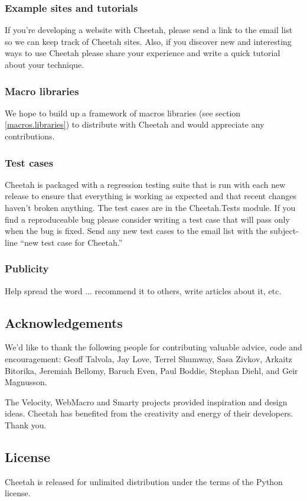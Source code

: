 \subsubsection{Example sites and tutorials}
If you're developing a website with Cheetah, please send a link to the
email list so we can keep track of Cheetah sites.  Also, if you discover
new and interesting ways to use Cheetah please share your experience and
write a quick tutorial about your technique.

\subsubsection{Macro libraries}
We hope to build up a framework of macros libraries (see section
\ref{macros.libraries}) to distribute with Cheetah and would appreciate
any contributions.

\subsubsection{Test cases}
Cheetah is packaged with a regression testing suite that is run with each
new release to ensure that everything is working as expected and that recent
changes haven't broken anything.  The test cases are in the Cheetah.Tests
module.  If you find a reproduceable bug please consider writing a test case
that will pass only when the bug is fixed.  Send any new test cases to the email
list with the subject-line ``new test case for Cheetah.''

\subsubsection{Publicity}
Help spread the word ... recommend it to others, write articles about it, etc.

\subsection{Acknowledgements}
\label{intro.acknowledgments}
    
We'd like to thank the following people for contributing valuable advice, code
and encouragement: Geoff Talvola, Jay Love, Terrel Shumway, Sasa Zivkov, Arkaitz
Bitorika, Jeremiah Bellomy, Baruch Even, Paul Boddie, Stephan Diehl, and Geir
Magnusson.
    
The Velocity, WebMacro and Smarty projects provided inspiration and design
ideas.  Cheetah has benefited from the creativity and energy of their
developers. Thank you.

\subsection{License}
\label{intro.license}

Cheetah is released for unlimited distribution under the terms of the
Python license.

